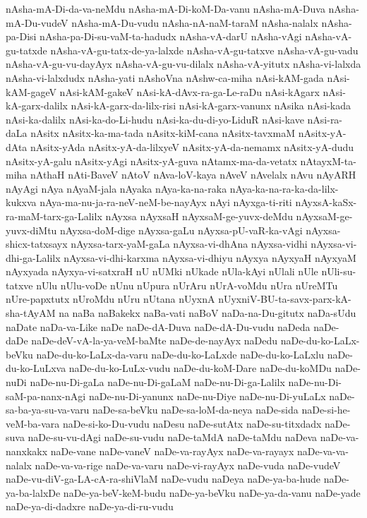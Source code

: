 {nAsha-mA-Di-da-va-neMdu
nAsha-mA-Di-koM-Da-vanu
nAsha-mA-Duva
nAsha-mA-Du-vudeV
nAsha-mA-Du-vudu
nAsha-nA-naM-taraM
nAsha-nalalx
nAsha-pa-Disi
nAsha-pa-Di-su-vaM-ta-hadudx
nAsha-vA-darU
nAsha-vAgi
nAsha-vA-gu-tatxde
nAsha-vA-gu-tatx-de-ya-lalxde
nAsha-vA-gu-tatxve
nAsha-vA-gu-vadu
nAsha-vA-gu-vu-dayAyx
nAsha-vA-gu-vu-dilalx
nAsha-vA-yitutx
nAsha-vi-lalxda
nAsha-vi-lalxdudx
nAsha-yati
nAshoVna
nAshw-ca-miha
nAsi-kAM-gada
nAsi-kAM-gageV
nAsi-kAM-gakeV
nAsi-kA-dAvx-ra-ga-Le-raDu
nAsi-kAgarx
nAsi-kA-garx-dalilx
nAsi-kA-garx-da-lilx-risi
nAsi-kA-garx-vanunx
nAsika
nAsi-kada
nAsi-ka-dalilx
nAsi-ka-do-Li-hudu
nAsi-ka-du-di-yo-LiduR
nAsi-kave
nAsi-ra-daLa
nAsitx
nAsitx-ka-ma-tada
nAsitx-kiM-cana
nAsitx-tavxmaM
nAsitx-yA-dAta
nAsitx-yAda
nAsitx-yA-da-lilxyeV
nAsitx-yA-da-nemamx
nAsitx-yA-dudu
nAsitx-yA-galu
nAsitx-yAgi
nAsitx-yA-guva
nAtamx-ma-da-vetatx
nAtayxM-ta-miha
nAthaH
nAti-BaveV
nAtoV
nAva-loV-kaya
nAveV
nAvelalx
nAvu
nAyARH
nAyAgi
nAya
nAyaM-jala
nAyaka
nAya-ka-na-raka
nAya-ka-na-ra-ka-da-lilx-kukxva
nAya-ma-nu-ja-ra-neV-neM-be-nayAyx
nAyi
nAyxga-ti-riti
nAyxsA-kaSx-ra-maM-tarx-ga-Lalilx
nAyxsa
nAyxsaH
nAyxsaM-ge-yuvx-deMdu
nAyxsaM-ge-yuvx-diMtu
nAyxsa-doM-dige
nAyxsa-gaLu
nAyxsa-pU-vaR-ka-vAgi
nAyxsa-shicx-tatxsayx
nAyxsa-tarx-yaM-gaLa
nAyxsa-vi-dhAna
nAyxsa-vidhi
nAyxsa-vi-dhi-ga-Lalilx
nAyxsa-vi-dhi-karxma
nAyxsa-vi-dhiyu
nAyxya
nAyxyaH
nAyxyaM
nAyxyada
nAyxya-vi-satxraH
nU
nUMki
nUkade
nUla-kAyi
nUlali
nUle
nUli-su-tatxve
nUlu
nUlu-voDe
nUnu
nUpura
nUrAru
nUrA-voMdu
nUra
nUreMTu
nUre-papxtutx
nUroMdu
nUru
nUtana
nUyxnA
nUyxniV-BU-ta-savx-parx-kA-sha-tAyAM
na
naBa
naBakekx
naBa-vati
naBoV
naDa-na-Du-gitutx
naDa-sUdu
naDate
naDa-va-Like
naDe
naDe-dA-Duva
naDe-dA-Du-vudu
naDeda
naDe-daDe
naDe-deV-vA-la-ya-veM-baMte
naDe-de-nayAyx
naDedu
naDe-du-ko-LaLx-beVku
naDe-du-ko-LaLx-da-varu
naDe-du-ko-LaLxde
naDe-du-ko-LaLxlu
naDe-du-ko-LuLxva
naDe-du-ko-LuLx-vudu
naDe-du-koM-Dare
naDe-du-koMDu
naDe-nuDi
naDe-nu-Di-gaLa
naDe-nu-Di-gaLaM
naDe-nu-Di-ga-Lalilx
naDe-nu-Di-saM-pa-nanx-nAgi
naDe-nu-Di-yanunx
naDe-nu-Diye
naDe-nu-Di-yuLaLx
naDe-sa-ba-ya-su-va-varu
naDe-sa-beVku
naDe-sa-loM-da-neya
naDe-sida
naDe-si-he-veM-ba-vara
naDe-si-ko-Du-vudu
naDesu
naDe-sutAtx
naDe-su-titxdadx
naDe-suva
naDe-su-vu-dAgi
naDe-su-vudu
naDe-taMdA
naDe-taMdu
naDeva
naDe-va-nanxkakx
naDe-vane
naDe-vaneV
naDe-va-rayAyx
naDe-va-rayayx
naDe-va-va-nalalx
naDe-va-va-rige
naDe-va-varu
naDe-vi-rayAyx
naDe-vuda
naDe-vudeV
naDe-vu-diV-ga-LA-cA-ra-shiVlaM
naDe-vudu
naDeya
naDe-ya-ba-hude
naDe-ya-ba-lalxDe
naDe-ya-beV-keM-budu
naDe-ya-beVku
naDe-ya-da-vanu
naDe-yade
naDe-ya-di-dadxre
naDe-ya-di-ru-vudu
}
